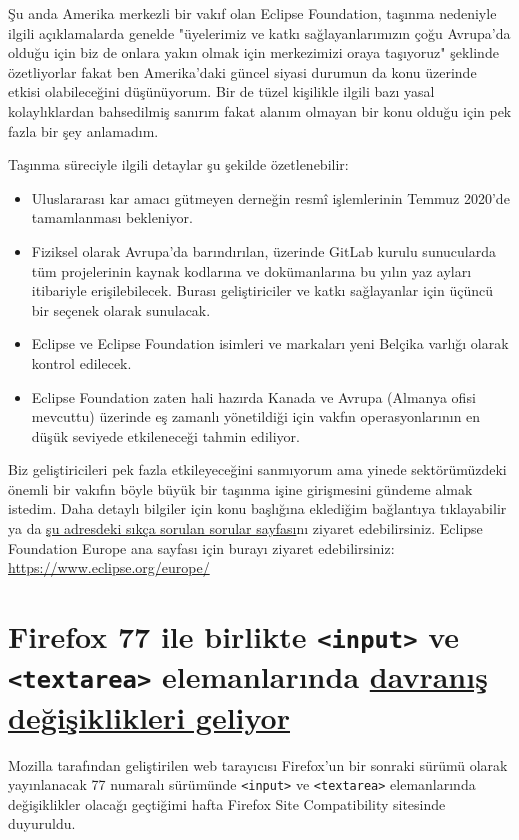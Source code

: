 \documentclass[11pt]{article}
\begin{document}
Şu anda Amerika merkezli bir vakıf olan Eclipse Foundation, taşınma nedeniyle
ilgili açıklamalarda genelde "üyelerimiz ve katkı sağlayanlarımızın çoğu
Avrupa'da olduğu için biz de onlara yakın olmak için merkezimizi oraya
taşıyoruz" şeklinde özetliyorlar fakat ben Amerika'daki güncel siyasi durumun
da konu üzerinde etkisi olabileceğini düşünüyorum. Bir de tüzel kişilikle
ilgili bazı yasal kolaylıklardan bahsedilmiş sanırım fakat alanım olmayan bir
konu olduğu için pek fazla bir şey anlamadım.

Taşınma süreciyle ilgili detaylar şu şekilde özetlenebilir:
\begin{itemize}
\item Uluslararası kar amacı gütmeyen derneğin resmî işlemlerinin Temmuz 2020'de
tamamlanması bekleniyor.
\item Fiziksel olarak Avrupa'da barındırılan, üzerinde GitLab kurulu sunucularda
tüm projelerinin kaynak kodlarına ve dokümanlarına bu yılın yaz ayları
itibariyle erişilebilecek. Burası geliştiriciler ve katkı sağlayanlar için
üçüncü bir seçenek olarak sunulacak.
\item Eclipse ve Eclipse Foundation isimleri ve markaları yeni Belçika varlığı olarak
kontrol edilecek.
\item Eclipse Foundation zaten hali hazırda Kanada ve Avrupa (Almanya ofisi
mevcuttu) üzerinde eş zamanlı yönetildiği için vakfın operasyonlarının en
düşük seviyede etkileneceği tahmin ediliyor.
\end{itemize}

Biz geliştiricileri pek fazla etkileyeceğini sanmıyorum ama yinede
sektörümüzdeki önemli bir vakıfın böyle büyük bir taşınma işine girişmesini
gündeme almak istedim. Daha detaylı bilgiler için konu başlığına eklediğim
bağlantıya tıklayabilir ya da \href{https://www.eclipse.org/europe/faq.php}{şu adresdeki sıkça sorulan sorular sayfası}nı
ziyaret edebilirsiniz. Eclipse Foundation Europe ana sayfası için burayı
ziyaret edebilirsiniz: \url{https://www.eclipse.org/europe/}
\section{Firefox 77 ile birlikte \texttt{<input>} ve \texttt{<textarea>} elemanlarında \href{https://www.fxsitecompat.dev/en-CA/docs/2020/text-exceeding-maxlength-will-no-longer-be-truncated-when-pasted-into-input-or-textarea/}{davranış değişiklikleri geliyor}}
\label{sec:org4d6b3a0}
Mozilla tarafından geliştirilen web tarayıcısı Firefox'un bir sonraki sürümü
olarak yayınlanacak 77 numaralı sürümünde \texttt{<input>} ve \texttt{<textarea>}
elemanlarında değişiklikler olacağı geçtiğimi hafta Firefox Site Compatibility
sitesinde duyuruldu.
\end{document}

